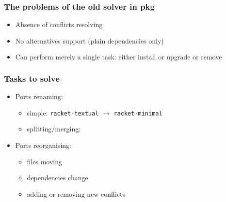 \documentclass{beamer}
\begin{document}
\begin{frame}
\frametitle{The problems of the old solver in pkg}

\begin{itemize}
\item Absence of conflicts resolving
\item No alternatives support (plain dependencies only)
\item Can perform merely a single task: either install or upgrade or remove
\end{itemize}

\end{frame}

\begin{frame}
\frametitle{Tasks to solve}
\begin{itemize}
  \item Ports renaming: 
  \begin{itemize}
    \item simple:
    \texttt{racket-textual} $\rightarrow$ \texttt{racket-minimal}
    \item splitting/merging: 
    \begin{figure}[h!]
	\end{figure}
  \end{itemize}
  \item Ports reorganising:
  	\begin{itemize}
    	\item files moving
    	\item dependencies change
    	\item adding or removing new conflicts
    \end{itemize} 

\end{itemize}
\end{frame}
\end{document}
